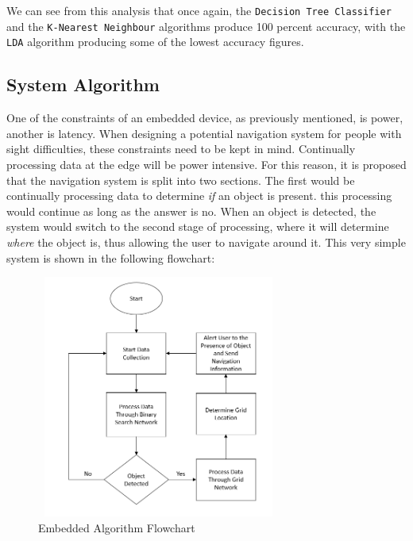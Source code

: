 \documentclass[conference]{IEEEtran}
\begin{document}
We can see from this analysis that once again, the \texttt{Decision Tree Classifier} and the \texttt{K-Nearest Neighbour} algorithms produce 100 percent accuracy, with the \texttt{LDA} algorithm producing some of the lowest accuracy figures. 

\subsection{System Algorithm}
One of the constraints of an embedded device, as previously mentioned, is power, another is latency. When designing a potential navigation system for people with sight difficulties, these constraints need to be kept in mind. Continually processing data at the edge will be power intensive. For this reason, it is proposed that the navigation system is split into two sections. The first would be continually processing data to determine \textit{if} an object is present. this processing would continue as long as the answer is no. When an object is detected, the system would switch to the second stage of processing, where it will determine \textit{where} the object is, thus allowing the user to navigate around it. This very simple system is shown in the following flowchart:

\begin{figure}[h]
\includegraphics[width=8cm, height=8cm]{images/embedded_algo_flowchart.png}
\centering
\caption{Embedded Algorithm Flowchart}
\label{fig:embedded_algo_flowchart}
\end{figure}




\printbibliography
\vspace{12pt}
\end{document}
